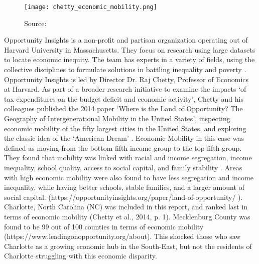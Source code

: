 
\begin{figure}
    \caption{Source: \cite{opportunityinsights}}
    \texttt{[image: chetty\_economic\_mobility.png]}
    \label{fig1}
\end{figure}






Opportunity Insights is a non-profit and partisan organization operating out of Harvard University in Massachusetts. They focus on research using large datasets to locate economic inequity. 
The team has experts in a variety of fields, using the collective disciplines to formulate solutions in battling inequality and poverty \parencite{opportunityinsights}. 
Opportunity Insights is led by Director Dr. Raj Chetty, Professor of Economics at Harvard. 
As part of a broader research initiative to examine the impacts `of  tax  expenditures  on  the  budget  deficit  and  economic  activity', Chetty and his colleagues published the 2014 paper `Where is the Land of Opportunity? The Geography of Intergenerational Mobility in the United States', inspecting economic mobility of the fifty largest cities in the United States, and exploring the classic idea of the `American Dream' \parencite{opportunityinsights, chetty2014}.
Economic Mobility in this case was defined as moving from the bottom fifth income group to the top fifth group. 
They found that mobility was linked with racial and income segregation, income inequality, school quality, access to social capital, and family stability \parencite{chetty2014}.
Areas with high economic mobility were also found to have less segregation and income inequality, while having better schools, stable families, and a larger amount of social capital. (https://opportunityinsights.org/paper/land-of-opportunity/ ). 
Charlotte, North Carolina (NC) was included in this report, and ranked last in terms of economic mobility (Chetty et al., 2014, p. 1). Mecklenburg County was found to be 99 out of 100 counties in terms of economic mobility (https://www.leadingonopportunity.org/about). This shocked those who saw Charlotte as a growing economic hub in the South-East, but not the residents of Charlotte struggling with this economic disparity. 
